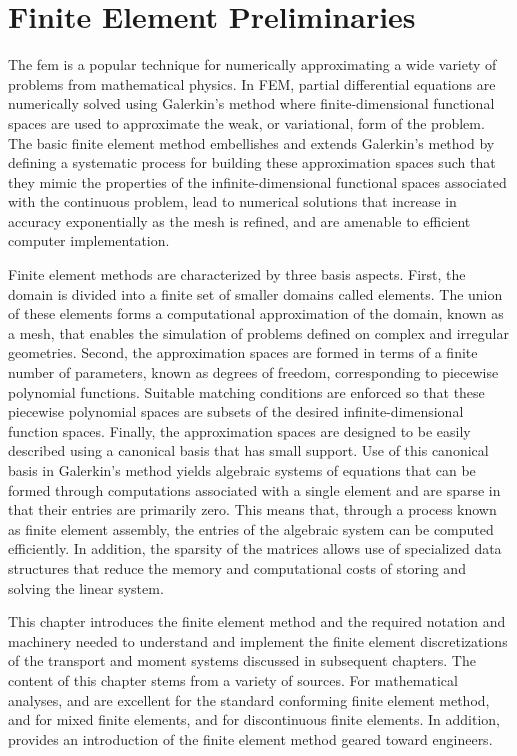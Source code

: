 \documentclass[../doc.tex]{subfiles}
\begin{document}
\chapter{Finite Element Preliminaries} \label{chap:fem}
The \gls{fem} is a popular technique for numerically approximating a wide variety of problems from mathematical physics. In FEM, partial differential equations are numerically solved using Galerkin's method where finite-dimensional functional spaces are used to approximate the weak, or variational, form of the problem.
The basic finite element method embellishes and extends Galerkin's method by defining a systematic process for building these approximation spaces such that they mimic the properties of the infinite-dimensional functional spaces associated with the continuous problem, lead to numerical solutions that increase in accuracy exponentially as the mesh is refined, and are amenable to efficient computer implementation. 

Finite element methods are characterized by three basis aspects. First, the domain is divided into a finite set of smaller domains called elements. The union of these elements forms a computational approximation of the domain, known as a mesh, that enables the simulation of problems defined on complex and irregular geometries. Second, the approximation spaces are formed in terms of a finite number of parameters, known as degrees of freedom, corresponding to piecewise polynomial functions. 
Suitable matching conditions are enforced so that these piecewise polynomial spaces are subsets of the desired infinite-dimensional function spaces. 
Finally, the approximation spaces are designed to be easily described using a canonical basis that has small support. Use of this canonical basis in Galerkin's method yields algebraic systems of equations that can be formed through computations associated with a single element and are sparse in that their entries are primarily zero. This means that, through a process known as finite element assembly, the entries of the algebraic system can be computed efficiently. In addition, the sparsity of the matrices allows use of specialized data structures that reduce the memory and computational costs of storing and solving the linear system.

This chapter introduces the finite element method and the required notation and machinery needed to understand and implement the finite element discretizations of the transport and moment systems discussed in subsequent chapters. The content of this chapter stems from a variety of sources. For mathematical analyses, \textcite{ciarlet1978finite} and \textcite{brenner_scott} are excellent for the standard conforming finite element method, \textcite{quateroni} and \textcite{mfem_boffi} for mixed finite elements, and \textcite{ern_guermond} for discontinuous finite elements. In addition, \textcite{zhodi} provides an introduction of the finite element method geared toward engineers. 
\end{document}
